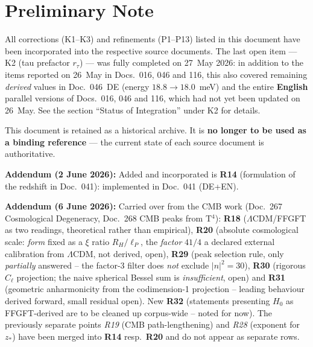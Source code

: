 
\section*{Preliminary Note}

\begin{tcolorbox}[colback=green!5!white, colframe=green!50!black, title={Status: C1--C3, R1--R32 (R16/R17 partial, R20/R30/R32 open, R29 partial, R31 partially derived) (as of 7 June 2026)}]
All corrections (K1–K3) and refinements (P1–P13) listed in this
document have been incorporated into the respective source documents.
The last open item --- K2 (tau prefactor $r_\tau$) --- was fully
completed on 27~May 2026: in addition to the items reported on 26~May
in Docs.~016, 046 and 116, this also covered remaining \emph{derived}
values in Doc.~046~DE (energy $18.8 \to 18.0$~meV) and the entire
\textbf{English} parallel versions of Docs.~016, 046 and 116, which had
not yet been updated on 26~May. See the section ``Status of Integration''
under K2 for details.

This document is retained as a historical archive.
It is \textbf{no longer to be used as a binding reference} —
the current state of each source document is authoritative.

\medskip

\textbf{Addendum (2 June 2026):} Added and incorporated is \textbf{R14}
(formulation of the redshift in Doc.~041): implemented in Doc.~041 (DE+EN).

\medskip

\textbf{Addendum (6 June 2026):} Carried over from the CMB work (Doc.~267
Cosmological Degeneracy, Doc.~268 CMB peaks from T$^4$): \textbf{R18}
($\Lambda$CDM/FFGFT as two readings, theoretical rather than empirical),
\textbf{R20} (absolute cosmological scale: \emph{form} fixed as a $\xi$ ratio $R_H/\ell_P$, the \emph{factor} $41/4$ a declared external calibration from $\Lambda$CDM, not derived, open), \textbf{R29} (peak selection rule,
only \emph{partially} answered -- the factor-3 filter does \emph{not} exclude
$|n|^2=30$), \textbf{R30} (rigorous $C_\ell$ projection; the naive spherical
Bessel sum is \emph{insufficient}, open) and \textbf{R31} (geometric
anharmonicity from the codimension-1 projection -- leading behaviour derived
forward, small residual open). New \textbf{R32} (statements presenting $H_0$ as FFGFT-derived are to be cleaned up corpus-wide -- noted for now). The previously separate points \emph{R19}
(CMB path-lengthening) and \emph{R28} (exponent for $z_*$) have been merged
into \textbf{R14} resp.\ \textbf{R20} and do not appear as separate rows.
\end{tcolorbox}

